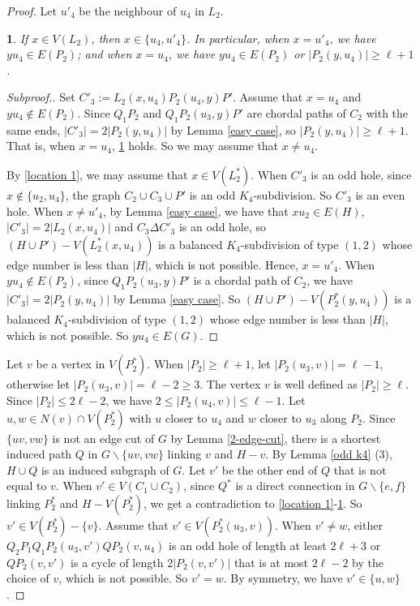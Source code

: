 \documentclass[11pt]{article}
\newtheorem{claim}{}[theorem]
\newcommand{\del}{\backslash}
\begin{document}
\begin{proof}
Let $u'_4$ be the neighbour of $u_4$ in $L_2$.
\begin{claim}\label{location 2}
If $x\in V(L_2)$, then $x\in \{u_4,u'_4\}$. In particular, when $x=u'_4$, we have $yu_4\in E(P_2)$; and when $x=u_4$, we have $yu_4\in E(P_2)$ or $|P_2(y,u_4)|\geq\ell+1$.
\end{claim}
\begin{proof}[Subproof.]
Set $C'_3:=L_2(x,u_4)P_2(u_4,y)P'$. Assume that $x=u_4$ and $yu_4\notin E(P_2)$. Since $Q_1P_2$ and $Q_1P_2(u_3,y)P'$ are chordal paths of $C_2$ with the same ends, $|C'_3|=2|P_2(y,u_4)|$ by Lemma \ref{easy case}, so $|P_2(y,u_4)|\geq\ell+1$. That is, when $x=u_4$, \ref{location 2} holds. So we may assume that $x\neq u_4$.

By \ref{location 1}, we may assume that $x\in V(L^*_2)$. When $C'_3$ is an odd hole, since $x\notin \{u_2,u_4\}$, the graph $C_2\cup C_3\cup P'$ is an odd $K_4$-subdivision. So $C'_3$ is an even hole. When $x\neq u'_4$, by Lemma \ref{easy case}, we have that $xu_2\in E(H)$, $|C'_3|=2|L_2(x,u_4)|$ and $C_3\Delta C'_3$ is an odd hole, so $(H\cup P')-V(L_2^*(x,u_4))$ is a balanced $K_4$-subdivision of type $(1,2)$ whose edge number is less than $|H|$, which is not possible. Hence, $x=u'_4$. When $yu_4\notin E(P_2)$, since $Q_1P_2(u_3,y)P'$ is a chordal path of $C_2$, we have $|C'_3|=2|P_2(y,u_4)|$ by Lemma \ref{easy case}. So $(H\cup P')-V(P_2^*(y,u_4))$ is a balanced $K_4$-subdivision  of type $(1,2)$ whose edge number is less than $|H|$, which is not possible. So $yu_4\in E(G)$.
\end{proof}

Let $v$ be a vertex in $V(P^*_2)$.  When $|P_2|\geq \ell+1$, let $|P_2(u_3,v)|=\ell-1$, otherwise let $|P_2(u_3,v)|=\ell-2\geq3$. The vertex $v$ is well defined as $|P_2|\geq\ell$. Since $|P_2|\leq 2\ell-2$, we have $2\leq |P_2(u_4,v)|\leq \ell-1$. Let $u,w\in N(v)\cap V(P^*_2)$ with $u$ closer to $u_4$ and $w$ closer to $u_3$ along $P_2$. Since $\{uv,vw\}$ is not an edge cut of $G$ by Lemma \ref{2-edge-cut}, there is a shortest induced path $Q$ in $G\del\{uv,vw\}$ linking $v$ and $H-v$. By Lemma \ref{odd k4} (3), $H\cup Q$ is an induced subgraph of $G$.  Let $v'$ be the other end of $Q$ that is not equal to $v$. When $v'\in V(C_1\cup C_2)$, since $Q^*$ is a direct connection in $G\del\{e,f\}$ linking $P_2^*$ and $H-V(P^*_2)$, we get a contradiction to \ref{location 1}-\ref{location 2}. So $v'\in V(P^*_2)-\{v\}$. Assume that $v'\in V(P_2^*(u_3,v))$. When $v'\neq w$, either $Q_2P_1Q_1P_2(u_3,v')QP_2(v,u_4)$ is an odd hole of length at least $2\ell+3$ or $QP_2(v,v')$ is a cycle of length $2|P_2(v,v')|$ that is at most $2\ell-2$ by the choice of $v$, which is not possible. So $v'=w$. By symmetry, we have $v'\in \{u,w\}$.


\end{proof}
\end{document}
